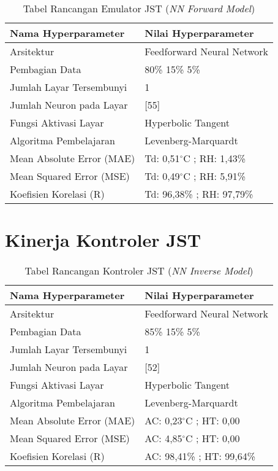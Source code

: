 \begin{table}[!h]
	\caption{Tabel Rancangan Emulator JST (\textit{NN Forward Model})}
	\label{tbl:A:NNEmulator}
	\centering
	\begin{tabular}{|p{5.7cm}|p{5cm}|}
		\hline
		\textbf{Nama Hyperparameter} & \textbf{Nilai Hyperparameter} \\ \hline
		Arsitektur & Feedforward Neural Network \\ \hline
		Pembagian Data & 80\% 15\% 5\% \\ \hline 
		Jumlah Layar Tersembunyi & 1 \\ \hline
		Jumlah Neuron pada Layar & [55] \\ \hline
		Fungsi Aktivasi Layar & Hyperbolic Tangent \\ \hline
		Algoritma Pembelajaran & Levenberg-Marquardt \\ \hline
		Mean Absolute Error (MAE) & Td: 0,51$^\circ$C ; RH: 1,43\% \\ \hline
		Mean Squared Error (MSE) & Td: 0,49$^\circ$C ; RH: 5,91\% \\ \hline
		Koefisien Korelasi (R) & Td: 96,38\% ; RH: 97,79\% \\ \hline
	\end{tabular}
\end{table}

\section{Kinerja Kontroler JST}

\begin{table}[!h]
	\caption{Tabel Rancangan Kontroler JST (\textit{NN Inverse Model})}
	\label{tbl:A:NNControler}
	\centering
	\begin{tabular}{|p{5.7cm}|p{5cm}|}
		\hline
		\textbf{Nama Hyperparameter} & \textbf{Nilai Hyperparameter} \\ \hline
		Arsitektur & Feedforward Neural Network \\ \hline
		Pembagian Data & 85\% 15\% 5\% \\ \hline 
		Jumlah Layar Tersembunyi & 1 \\ \hline
		Jumlah Neuron pada Layar & [52] \\ \hline
		Fungsi Aktivasi Layar & Hyperbolic Tangent \\ \hline
		Algoritma Pembelajaran & Levenberg-Marquardt \\ \hline
		Mean Absolute Error (MAE) & AC: 0,23$^\circ$C ; HT: 0,00 \\ \hline
		Mean Squared Error (MSE) & AC: 4,85$^\circ$C ; HT: 0,00 \\ \hline
		Koefisien Korelasi (R) & AC: 98,41\% ; HT: 99,64\% \\ \hline
	\end{tabular}
\end{table}

